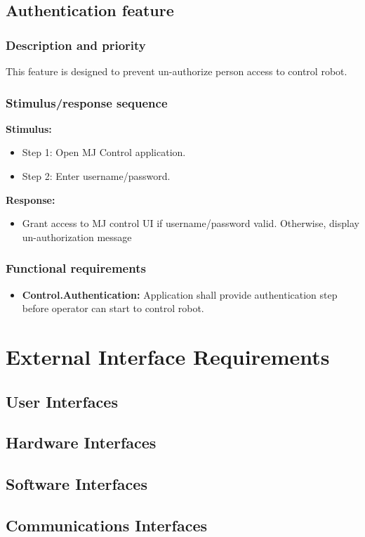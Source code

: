 \documentclass[10pt,a4paper,titlepage]{article}
\begin{document}
 
	 \subsection{Authentication feature }
	 \subsubsection{Description and priority}
	 \text This feature is designed to prevent un-authorize person access to control robot.
	 \subsubsection{Stimulus/response sequence}
	 \textbf{Stimulus:}
	 \begin{itemize}
	 	\item Step 1: Open MJ Control application.
	 	\item Step 2: Enter username/password.
	 \end{itemize}
	 \textbf{Response:}
	\begin{itemize}
		\item Grant access to MJ control UI if username/password valid. Otherwise, display un-authorization message
	\end{itemize}
	 \subsubsection{Functional requirements}
	 \begin{itemize}
	 	\item \textbf{Control.Authentication:}  Application shall provide authentication step before operator can start to control robot.
	 \end{itemize}
	
	\section{External Interface Requirements}
	\subsection{User Interfaces}
	\subsection{Hardware Interfaces}
	\subsection{Software Interfaces}
	\subsection{Communications Interfaces}
\end{document}
